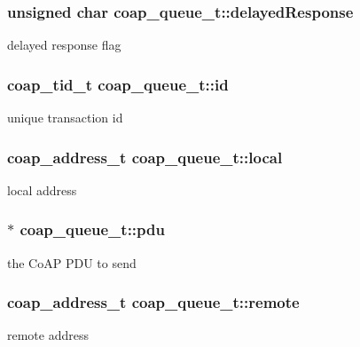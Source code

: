 \subsubsection[{delayed\+Response}]{\setlength{\rightskip}{0pt plus 5cm}unsigned char coap\+\_\+queue\+\_\+t\+::delayed\+Response}\label{structcoap__queue__t_a9ac0e0094dba5cfbd24f6509c5c3f665}
delayed response flag \hypertarget{structcoap__queue__t_aeded9dd536f54ee47418575711e7dbac}{}
\subsubsection[{id}]{\setlength{\rightskip}{0pt plus 5cm}coap\+\_\+tid\+\_\+t coap\+\_\+queue\+\_\+t\+::id}\label{structcoap__queue__t_aeded9dd536f54ee47418575711e7dbac}
unique transaction id \hypertarget{structcoap__queue__t_a19d2b774c366900ac9b34869cec54ec5}{}
\subsubsection[{local}]{\setlength{\rightskip}{0pt plus 5cm}coap\+\_\+address\+\_\+t coap\+\_\+queue\+\_\+t\+::local}\label{structcoap__queue__t_a19d2b774c366900ac9b34869cec54ec5}
local address \hypertarget{structcoap__queue__t_a2bc9a6e3ed0442653e53b92f5fa92954}{}
\subsubsection[{pdu}]{$\ast$ coap\+\_\+queue\+\_\+t\+::pdu}\label{structcoap__queue__t_a2bc9a6e3ed0442653e53b92f5fa92954}
the Co\+A\+P P\+D\+U to send \hypertarget{structcoap__queue__t_a15ba08baabdadfe7ec9179e7dba5b5f2}{}
\subsubsection[{remote}]{\setlength{\rightskip}{0pt plus 5cm}coap\+\_\+address\+\_\+t coap\+\_\+queue\+\_\+t\+::remote}\label{structcoap__queue__t_a15ba08baabdadfe7ec9179e7dba5b5f2}
remote address \hypertarget{structcoap__queue__t_aff24f5a43b3d2182535bc7bd2b5f5341}{}
